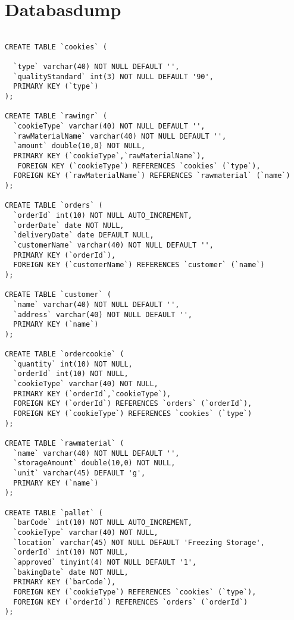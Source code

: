 

\section{Databasdump}



\begin{lstlisting}

CREATE TABLE `cookies` (

  `type` varchar(40) NOT NULL DEFAULT '',
  `qualityStandard` int(3) NOT NULL DEFAULT '90',
  PRIMARY KEY (`type`)
);

CREATE TABLE `rawingr` (
  `cookieType` varchar(40) NOT NULL DEFAULT '',
  `rawMaterialName` varchar(40) NOT NULL DEFAULT '',
  `amount` double(10,0) NOT NULL,
  PRIMARY KEY (`cookieType`,`rawMaterialName`),
   FOREIGN KEY (`cookieType`) REFERENCES `cookies` (`type`),
  FOREIGN KEY (`rawMaterialName`) REFERENCES `rawmaterial` (`name`)
);

CREATE TABLE `orders` (
  `orderId` int(10) NOT NULL AUTO_INCREMENT,
  `orderDate` date NOT NULL,
  `deliveryDate` date DEFAULT NULL,
  `customerName` varchar(40) NOT NULL DEFAULT '',
  PRIMARY KEY (`orderId`),
  FOREIGN KEY (`customerName`) REFERENCES `customer` (`name`)
);

CREATE TABLE `customer` (
  `name` varchar(40) NOT NULL DEFAULT '',
  `address` varchar(40) NOT NULL DEFAULT '',
  PRIMARY KEY (`name`)
);

CREATE TABLE `ordercookie` (
  `quantity` int(10) NOT NULL,
  `orderId` int(10) NOT NULL,
  `cookieType` varchar(40) NOT NULL,
  PRIMARY KEY (`orderId`,`cookieType`),
  FOREIGN KEY (`orderId`) REFERENCES `orders` (`orderId`),
  FOREIGN KEY (`cookieType`) REFERENCES `cookies` (`type`)
);

CREATE TABLE `rawmaterial` (
  `name` varchar(40) NOT NULL DEFAULT '',
  `storageAmount` double(10,0) NOT NULL,
  `unit` varchar(45) DEFAULT 'g',
  PRIMARY KEY (`name`)
);

CREATE TABLE `pallet` (
  `barCode` int(10) NOT NULL AUTO_INCREMENT,
  `cookieType` varchar(40) NOT NULL,
  `location` varchar(45) NOT NULL DEFAULT 'Freezing Storage',
  `orderId` int(10) NOT NULL,
  `approved` tinyint(4) NOT NULL DEFAULT '1',
  `bakingDate` date NOT NULL,
  PRIMARY KEY (`barCode`),
  FOREIGN KEY (`cookieType`) REFERENCES `cookies` (`type`),
  FOREIGN KEY (`orderId`) REFERENCES `orders` (`orderId`)
);
\end{lstlisting}